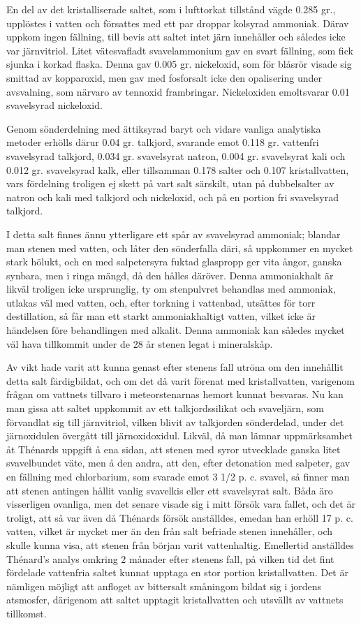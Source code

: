\documentclass[a4paper, 12pt, oneside, swedish]{article}
\begin{document}
En del av det kristalliserade saltet, som i lufttorkat tillstånd vägde 0.285 gr., upplöstes i vatten och försattes med ett par droppar kolsyrad ammoniak. Därav uppkom ingen fällning, till bevis att saltet intet järn innehåller och således icke var järnvitriol. Litet vätesvafladt svavelammonium gav en svart fällning, som fick sjunka i korkad flaska. Denna gav 0.005 gr. nickeloxid, som för blåsrör visade sig smittad av kopparoxid, men gav med fosforsalt icke den opalisering under avsvalning, som närvaro av tennoxid frambringar. Nickeloxiden emoltsvarar 0.01 svavelsyrad nickeloxid.

Genom sönderdelning med ättiksyrad baryt och vidare vanliga analytiska metoder erhölls därur 0.04 gr. talkjord, svarande emot 0.118 gr. vattenfri svavelsyrad talkjord, 0.034 gr. svavelsyrat natron, 0.004 gr. svavelsyrat kali och 0.012 gr. svavelsyrad kalk, eller tillsamman 0.178 salter och 0.107 kristallvatten, vars fördelning troligen ej skett på vart salt särskilt, utan på dubbelsalter av natron och kali med talkjord och nickeloxid, och på en portion fri svavelsyrad talkjord.

I detta salt finnes ännu ytterligare ett spår av svavelsyrad ammoniak; blandar man stenen med vatten, och låter den sönderfalla däri, så uppkommer en mycket stark hölukt, och en med salpetersyra fuktad glaspropp ger vita ångor, ganska synbara, men i ringa mängd, då den hålles däröver. Denna ammoniakhalt är likväl troligen icke ursprunglig, ty om stenpulvret behandlas med ammoniak, utlakas väl med vatten, och, efter torkning i vattenbad, utsättes för torr destillation, så får man ett starkt ammoniakhaltigt vatten, vilket icke är händelsen före behandlingen med alkalit. Denna ammoniak kan således mycket väl hava tillkommit under de 28 år stenen legat i mineralskåp.

Av vikt hade varit att kunna genast efter stenens fall utröna om den innehållit detta salt färdigbildat, och om det då varit förenat med kristallvatten, varigenom frågan om vattnets tillvaro i meteorstenarnas hemort kunnat besvaras. Nu kan man gissa att saltet uppkommit av ett talkjordssilikat och svaveljärn, som förvandlat sig till järnvitriol, vilken blivit av talkjorden sönderdelad, under det järnoxidulen övergått till järnoxidoxidul. Likväl, då man lämnar uppmärksamhet åt Thénards uppgift å ena sidan, att stenen med syror utvecklade ganska litet svavelbundet väte, men å den andra, att den, efter detonation med salpeter, gav en fällning med chlorbarium, som svarade emot 3 1/2 p. c. svavel, så finner man att stenen antingen hållit vanlig svavelkis eller ett svavelsyrat salt. Båda äro visserligen ovanliga, men det senare visade sig i mitt försök vara fallet, och det är troligt, att så var även då Thénards försök anställdes, emedan han erhöll 17 p. c. vatten, vilket är mycket mer än den från salt befriade stenen innehåller, och skulle kunna visa, att stenen från början varit vattenhaltig. Emellertid anställdes Thénard's analys omkring 2 månader efter stenens fall, på vilken tid det fint fördelade vattenfria saltet kunnat upptaga en stor portion kristallvatten. Det är nämligen möjligt att anfloget av bittersalt småningom bildat sig i jordens atsmosfer, därigenom att saltet upptagit kristallvatten och utsvällt av vattnets tillkomst.
\end{document}
